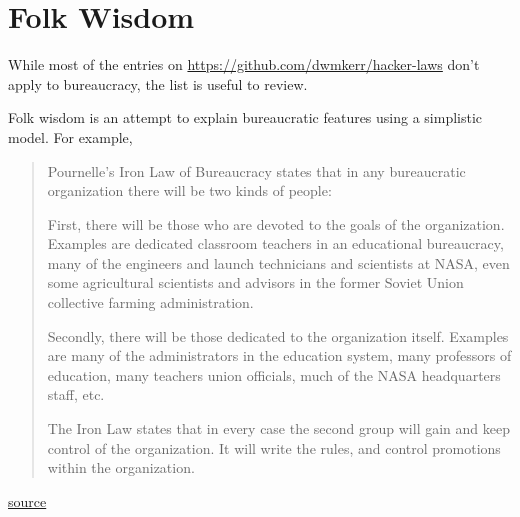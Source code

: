 \section{Folk Wisdom\label{sec:folk-wisdom}}

While most of the entries on
 \href{https://github.com/dwmkerr/hacker-laws}{https://github.com/dwmkerr/hacker-laws}
don't apply to bureaucracy, the list is useful to review. 


Folk wisdom is an attempt to explain bureaucratic features using a simplistic model. For example,

\begin{quote}
Pournelle's Iron Law of Bureaucracy states that in any bureaucratic organization there will be two kinds of people:

First, there will be those who are devoted to the goals of the organization. Examples are dedicated classroom teachers in an educational bureaucracy, many of the engineers and launch technicians and scientists at NASA, even some agricultural scientists and advisors in the former Soviet Union collective farming administration.

Secondly, there will be those dedicated to the organization itself. Examples are many of the administrators in the education system, many professors of education, many teachers union officials, much of the NASA headquarters staff, etc.

The Iron Law states that in every case the second group will gain and keep control of the organization. It will write the rules, and control promotions within the organization.
\end{quote}
\href{https://www.jerrypournelle.com/reports/jerryp/iron.html}{source}

